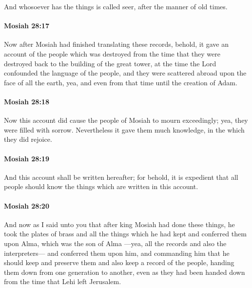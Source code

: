 			And whosoever has the things is called seer, after the manner of old times.

		\paragraph{Mosiah 28:17} %
			\label{MOSIAH-28-17}

			Now after Mosiah had finished translating these records,
			behold, it gave an account of the people which was destroyed
			from the time that they were destroyed
			back to the building of the great tower,
			at the time the Lord confounded the language of the people,
			and they were scattered abroad upon the face of all the earth,
			yea, and even from that time until the creation of Adam.

		\paragraph{Mosiah 28:18} %
			\label{MOSIAH-28-18}

			Now this account did cause the people of Mosiah to mourn exceedingly;
			yea, they were filled with sorrow.
			Nevertheless it gave them much knowledge,
			in the which they did rejoice.

		\paragraph{Mosiah 28:19} %
			\label{MOSIAH-28-19}

			And this account shall be written hereafter;
			for behold, it is expedient
			that all people should know the things which are written in this account.

		\paragraph{Mosiah 28:20} %
			\label{MOSIAH-28-20}

			And now as I said unto you that
			after king Mosiah had done these things,
			he took the plates of brass and all the things which he had kept
			and conferred them upon Alma, which was the son of Alma
			---yea, all the records and also the interpreters---
			and conferred them upon him,
			and commanding him that he should keep and preserve them
			and also keep a record of the people,
			handing them down from one generation to another,
			even as they had been handed down from the time that Lehi left Jerusalem.

